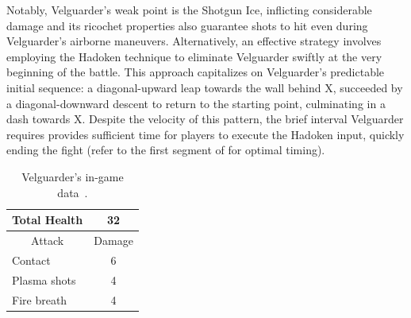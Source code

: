 Notably, Velguarder's weak point is the Shotgun Ice, inflicting considerable damage and its ricochet properties also guarantee shots to hit even during Velguarder's airborne maneuvers. Alternatively, an effective strategy involves employing the Hadoken technique to eliminate Velguarder swiftly at the very beginning of the battle. This approach capitalizes on Velguarder's predictable initial sequence: a diagonal-upward leap towards the wall behind X, succeeded by a diagonal-downward descent to return to the starting point, culminating in a dash towards X. Despite the velocity of this pattern, the brief interval Velguarder requires provides sufficient time for players to execute the Hadoken input, quickly ending the fight (refer to the first segment of  for optimal timing).

\begin{table}[htp]
	\centering
	\begin{tabular}[h]{l c}
		\toprule
		Total Health  & 32\\
		\midrule
		\multicolumn{1}{c}{Attack} & \multicolumn{1}{c}{Damage}\\
		Contact & 6\\
		Plasma shots& 4\\
		Fire breath& 4\\
		\bottomrule
	\end{tabular}
	\caption{Velguarder's in-game data~\cite{wiki:Velguarder,book:Compendium}.}
\end{table}

